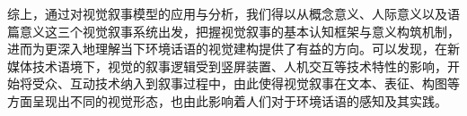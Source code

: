 综上，通过对视觉叙事模型的应用与分析，我们得以从概念意义、人际意义以及语篇意义这三个视觉叙事系统出发，把握视觉叙事的基本认知框架与意义构筑机制，进而为更深入地理解当下环境话语的视觉建构提供了有益的方向。可以发现，在新媒体技术语境下，视觉的叙事逻辑受到竖屏装置、人机交互等技术特性的影响，开始将受众、互动技术纳入到叙事过程中，由此使得视觉叙事在文本、表征、构图等方面呈现出不同的视觉形态，也由此影响着人们对于环境话语的感知及其实践。
